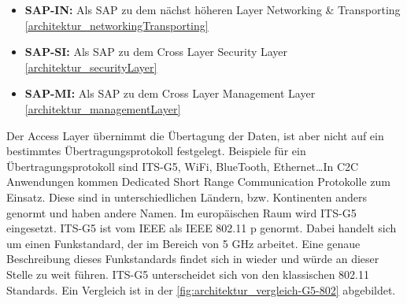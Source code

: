 \begin{itemize}
	\item \textbf{SAP-IN: } Als \ac{SAP} zu dem nächst höheren Layer  Networking \& Transporting \ref{architektur_networkingTransporting}
	\item \textbf{SAP-SI: } Als \ac{SAP} zu dem Cross Layer Security Layer \ref{architektur_securityLayer}
	\item \textbf{SAP-MI: } Als \ac{SAP} zu dem Cross Layer Management Layer \ref{architektur_managementLayer}
\end{itemize}

Der Access Layer übernimmt die Übertagung der Daten, ist aber nicht auf ein bestimmtes Übertragungsprotokoll festgelegt. Beispiele für ein Übertragungsprotokoll sind ITS-G5, WiFi, BlueTooth, Ethernet\dots In \ac{C2C} Anwendungen kommen Dedicated Short Range Communication Protokolle zum Einsatz. Diese sind in unterschiedlichen Ländern, bzw. Kontinenten anders genormt und haben andere Namen. Im europäischen Raum wird \ac{ITS-G5} eingesetzt. \ac{ITS-G5} ist vom \ac{IEEE} als \ac{IEEE} 802.11 p genormt. Dabei handelt sich um einen Funkstandard, der im Bereich von 5 GHz arbeitet. Eine genaue Beschreibung dieses Funkstandards findet sich in \cite{en302663} wieder und würde an dieser Stelle zu weit führen. \ac{ITS-G5} unterscheidet sich von den klassischen 802.11 Standards. Ein Vergleich ist in der \autoref{fig:architektur_vergleich-G5-802} abgebildet. 

